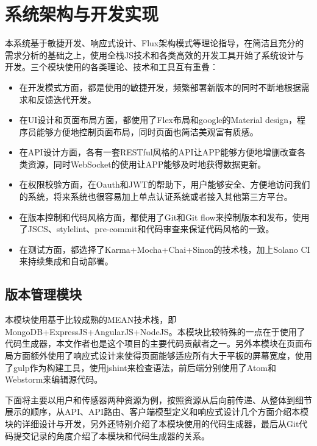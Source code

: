 
\chapter{系统架构与开发实现}
\label{chap:design_and_implement}
本系统基于敏捷开发、响应式设计、Flux架构模式等理论指导，在简洁且充分的需求分析的基础之上，使用全栈JS技术和各类高效的开发工具开始了系统设计与开发。三个模块使用的各类理论、技术和工具互有重叠：
\begin{itemize}
  \item 在开发模式方面，都是使用的敏捷开发，频繁部署新版本的同时不断地根据需求和反馈迭代开发。
  \item 在UI设计和页面布局方面，都使用了Flex布局和google的Material design，程序员能够方便地控制页面布局，同时页面也简洁美观富有质感。
  \item 在API设计方面，各有一套RESTful风格的API让APP能够方便地增删改查各类资源，同时WebSocket的使用让APP能够及时地获得数据更新。
  \item 在权限校验方面，在Oauth和JWT的帮助下，用户能够安全、方便地访问我们的系统，将来系统也很容易加上单点认证系统或者接入其他第三方平台。
  \item 在版本控制和代码风格方面，都使用了Git和Git flow来控制版本和发布，使用了JSCS、stylelint、pre-commit和代码审查来保证代码风格的一致。
  \item 在测试方面，都选择了Karma+Mocha+Chai+Sinon的技术栈，加上Solano CI来持续集成和自动部署。
\end{itemize}
\section{版本管理模块}
本模块使用基于比较成熟的MEAN技术栈，即MongoDB+ExpressJS+AngularJS+NodeJS。本模块比较特殊的一点在于使用了代码生成器，本文作者也是这个项目的主要代码贡献者之一。另外本模块在页面布局方面额外使用了响应式设计来使得页面能够适应所有大于平板的屏幕宽度，使用了gulp作为构建工具，使用jshint来检查语法，前后端分别使用了Atom和Webstorm来编辑源代码。

下面将主要以用户和传感器两种资源为例，按照资源从后向前传递、从整体到细节展示的顺序，从API、API路由、客户端模型定义和响应式设计几个方面介绍本模块的详细设计与开发，另外还特别介绍了本模块使用的代码生成器，最后从Git代码提交记录的角度介绍了本模块和代码生成器的关系。
